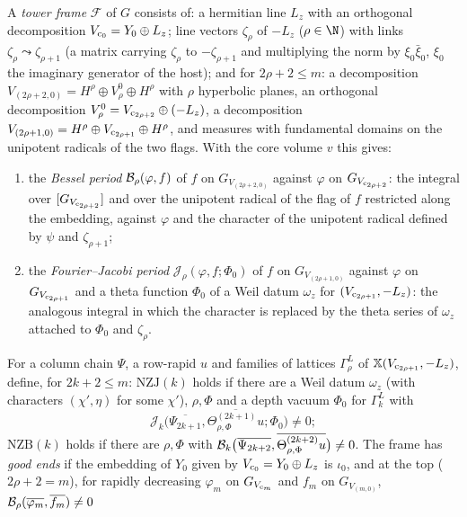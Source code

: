 \begin{definition}\label{pf:fs:frames}
A \emph{tower frame} $\mathcal F$ of $G$ consists of: a hermitian line $L_z$ with an orthogonal decomposition
$V_{\mathrm{c}_0}=Y_0\oplus L_z$; line vectors $\zeta_\rho$ of $-L_z$ ($\rho\in\N$) with links $\zeta_{\rho}\leadsto\zeta_{\rho+1}$ (a matrix
carrying $\zeta_\rho$ to $-\zeta_{\rho+1}$ and multiplying the norm by $\xi_0\bar\xi_0$, $\xi_0$ the imaginary generator of the host);
and for $2\rho+2\le m$: a decomposition $V_{(2\rho+2,0)}=H^\rho\oplus V^0_\rho\oplus H^\rho$ with $\rho$ hyperbolic planes, an orthogonal
decomposition $V^0_\rho=V_{\mathrm{c}_{2\rho+2}}\oplus(-L_z)$, a decomposition $V_{(2\rho+1,0)}=H^\rho\oplus V_{\mathrm{c}_{2\rho+1}}\oplus H^\rho$, and
measures with fundamental domains on the unipotent radicals of the two flags. With the core volume $v$ this gives:
\begin{enumerate}[label=(\alph*)]
\item the \emph{Bessel period} $\mathcal B_\rho(\varphi,f)$ of $f$ on $G_{V_{(2\rho+2,0)}}$ against $\varphi$ on $G_{V_{\mathrm{c}_{2\rho+2}}}$: the
integral over $[G_{V_{\mathrm{c}_{2\rho+2}}}]$ and over the unipotent radical of the flag of $f$ restricted along the embedding, against $\varphi$
and the character of the unipotent radical defined by $\psi$ and $\zeta_{\rho+1}$;
\item the \emph{Fourier--Jacobi period} $\mathcal J_\rho(\varphi,f;\Phi_0)$ of $f$ on $G_{V_{(2\rho+1,0)}}$ against $\varphi$ on
$G_{V_{\mathrm{c}_{2\rho+1}}}$ and a theta function $\Phi_0$ of a Weil datum $\omega_z$ for $(V_{\mathrm{c}_{2\rho+1}},-L_z)$: the analogous integral in
which the character is replaced by the theta series of $\omega_z$ attached to $\Phi_0$ and $\zeta_\rho$.
\end{enumerate}
For a column chain $\Psi$, a row-rapid $u$ and families of lattices $\Gamma^L_\rho$ of $\mathbb X(V_{\mathrm{c}_{2\rho+1}},-L_z)$, define, for
$2k+2\le m$: $\mathrm{NZJ}(k)$ holds if there are a Weil datum $\omega_z$ (with characters $(\chi',\eta)$ for some $\chi'$), $\rho,\Phi$ and a
depth vacuum $\Phi_0$ for $\Gamma^L_k$ with
\[
\mathcal J_k\bigl(\overline{\Psi_{2k+1}},\overline{\Theta^{(2k+1)}_{\rho,\Phi}u};\Phi_0\bigr)\neq0;
\]
$\mathrm{NZB}(k)$ holds if there are $\rho,\Phi$ with
$\mathcal B_k\bigl(\overline{\Psi_{2k+2}},\overline{\Theta^{(2k+2)}_{\rho,\Phi}u}\bigr)\neq0$. The frame has \emph{good ends} if the embedding of
$Y_0$ given by $V_{\mathrm{c}_0}=Y_0\oplus L_z$ is $\iota_0$, and at the
top ($2\rho+2=m$), for rapidly decreasing $\varphi_m$ on $G_{V_{\mathrm{c}_m}}$ and $f_m$ on $G_{V_{(m,0)}}$, $\mathcal B_\rho(\overline{\varphi_m},\overline{f_m})\ne0$

\end{definition}
